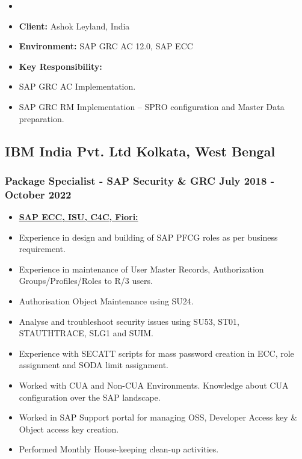 \documentclass[10pt]{article}
\begin{document}
\begin{itemize}
    \begin{itemize}
        \item[]  
			\item[\ding{226}] \textbf {Client:} Ashok Leyland, India
			\item[] \textbf {Environment: } SAP GRC AC 12.0, SAP ECC
    \end{itemize}

    \begin{itemize}
        \item[] \textbf {Key Responsibility:}
			\item SAP GRC AC Implementation.
			\item SAP GRC RM Implementation – SPRO configuration and Master Data preparation.
    \end{itemize}
\end{itemize}

\titlerule {\ }{}{}

\subsection{IBM India Pvt. Ltd \hfill \normalfont Kolkata, West Bengal}
\subsubsection{Package Specialist - SAP Security \& GRC \hfill  July 2018 - October 2022 \\}

	\begin{itemize}
		\small
     		\item[] \textbf{\underline{SAP ECC, ISU, C4C, Fiori:}} 
     			\item Experience in design and building of SAP PFCG roles as per business requirement.
				\item Experience in maintenance of User Master Records, Authorization Groups/Profiles/Roles to R/3 users.
				\item Authorisation Object Maintenance using SU24.
				\item Analyse and troubleshoot security issues using SU53, ST01, STAUTHTRACE, SLG1 and SUIM.
				\item Experience with SECATT scripts for mass password creation in ECC, role assignment and SODA limit assignment.
				\item Worked with CUA and Non-CUA Environments. Knowledge about %
					CUA configuration over the SAP landscape.
				\item Worked in SAP Support portal for managing OSS, Developer Access key \& Object access key creation.
				\item Performed Monthly House-keeping clean-up activities.
	\end{itemize}
\end{document}
